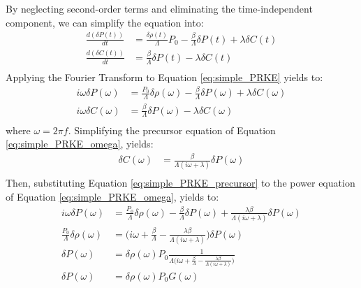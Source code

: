By neglecting second-order terms and eliminating the time-independent component, we can simplify the equation into:
\begin{equation}
    \begin{aligned}\label{eq:simple_PRKE}
        \frac{d(\delta P(t))}{dt} &= \frac{\delta \rho(t)}{\Lambda} P_0 - \frac{\beta}{\Lambda} \delta P(t) + \lambda \delta C(t)\\
        \frac{d(\delta C(t))}{dt} &= \frac{\beta}{\Lambda} \delta P(t) - \lambda \delta C(t)\\
    \end{aligned}
\end{equation}
Applying the Fourier Transform to Equation \ref{eq:simple_PRKE} yields to:
\begin{equation}
    \begin{aligned}\label{eq:simple_PRKE_omega}
        i \omega \delta P(\omega) &= \frac{P_0}{\Lambda} \delta \rho(\omega) - \frac{\beta}{\Lambda} \delta P(\omega) + \lambda \delta C(\omega)\\
        i \omega \delta C(\omega) &= \frac{\beta}{\Lambda} \delta P(\omega) - \lambda \delta C(\omega)\\
    \end{aligned}
\end{equation}
where $\omega = 2 \pi f$. Simplifying the precursor equation of Equation \ref{eq:simple_PRKE_omega}, yields:
\begin{equation}
    \begin{aligned}\label{eq:simple_PRKE_precursor}
        \delta C(\omega) &= \frac{\beta}{\Lambda (i \omega + \lambda)} \delta P(\omega)\\
    \end{aligned}
\end{equation}
Then, substituting Equation \ref{eq:simple_PRKE_precursor} to the power equation of Equation \ref{eq:simple_PRKE_omega}, yields to:
\begin{equation}
    \begin{aligned}\label{eq:simple_power_omega}
        i \omega \delta P(\omega) &= \frac{P_0}{\Lambda} \delta \rho(\omega) - \frac{\beta}{\Lambda} \delta P(\omega) + \frac{\lambda \beta}{\Lambda (i \omega + \lambda)} \delta P(\omega)\\
        \frac{P_0}{\Lambda} \delta \rho(\omega) &= \biggl( i \omega +  \frac{\beta}{\Lambda} - \frac{\lambda \beta}{\Lambda (i \omega + \lambda)} \biggr) \delta P(\omega) \\
        \delta P(\omega) &= \delta \rho(\omega)P_0 \frac{1}{\Lambda \biggl( i \omega +  \frac{\beta}{\Lambda} - \frac{\lambda \beta}{\Lambda (i \omega + \lambda)} \biggr)} \\
        \delta P(\omega) &= \delta \rho(\omega)P_0 G(\omega)\\
    \end{aligned}
\end{equation}
